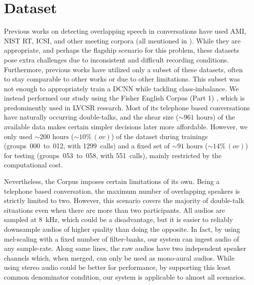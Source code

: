 \documentclass[a4paper]{article}
\begin{document}
\section{Dataset} \label{sec:dataset}
Previous works on detecting overlapping speech in conversations have used AMI, NIST RT, ICSI,
and other meeting corpora (all mentioned in \cite{cetin_speaker_2006}).
While they are appropriate, and perhaps the flagship scenario for this problem,
these datasets pose extra challenges due to inconsistent and difficult recording conditions.
Furthermore, previous works have utilized only a subset of these datasets,
often to stay comparable to other works or due to other limitations.
This subset was not enough to appropriately train a DCNN while tackling class-imbalance.
We instead performed our study using the Fisher English Corpus (Part 1) \cite{cieri_switchboard_2003},
which is predominently used in LVCSR research.
Most of its telephone based conversations have naturally occurring double-talks,
and the shear size ($\sim \! \text{961~hours}$) of the available data makes certain simpler decisions later more affordable.
However, we only used $\sim \! \text{200~hours}$
($\sim \! \text{10\%}\,(ov)$) of the dataset during trainings
(groups~000~to~012, with 1299~calls) and a fixed set of
$\sim \! \text{91~hours}$ ($\sim \! \text{14\%}\,(ov)$) for testing
(groups~053~to~058, with 551~calls),
mainly restricted by the computational cost.

Nevertheless, the Corpus imposes certain limitations of its own.
Being a telephone based conversation,
the maximum number of overlapping speakers is strictly limited to two.
However, this scenario covers the majority of double-talk situations even when there are more than two participants.
All audios are sampled at 8~kHz, which could be a disadvantage,
but it is easier to reliably downsample audios of higher quality than doing the opposite.
In fact, by using mel-scaling with a fixed number of filter-banks,
our system can ingest audio of any sample-rate.
Along same lines,
the raw audios have two independent speaker channels which, when merged,
can only be used as mono-aural audios.
While using stereo audio could be better for performance,
by supporting this least common denominator condition,
our system is applicable to almost all scenarios.
\end{document}

